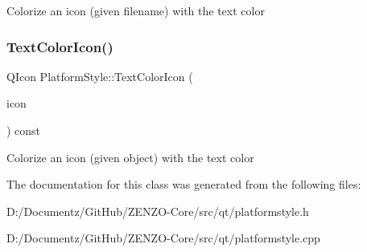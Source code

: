 Colorize an icon (given filename) with the text color \mbox{\label{class_platform_style_adf1b4129d4d6ccff590d202b95718892}} 
\subsubsection{\texorpdfstring{TextColorIcon()}{TextColorIcon()}\hspace{0.1cm}{\footnotesize\ttfamily [2/2]}}
{\footnotesize\ttfamily Q\+Icon Platform\+Style\+::\+Text\+Color\+Icon (\begin{DoxyParamCaption}\item[{const Q\+Icon \&}]{icon }\end{DoxyParamCaption}) const}

Colorize an icon (given object) with the text color 

The documentation for this class was generated from the following files\+:\begin{DoxyCompactItemize}
\item 
D\+:/\+Documentz/\+Git\+Hub/\+Z\+E\+N\+Z\+O-\/\+Core/src/qt/platformstyle.\+h\item 
D\+:/\+Documentz/\+Git\+Hub/\+Z\+E\+N\+Z\+O-\/\+Core/src/qt/platformstyle.\+cpp\end{DoxyCompactItemize}
